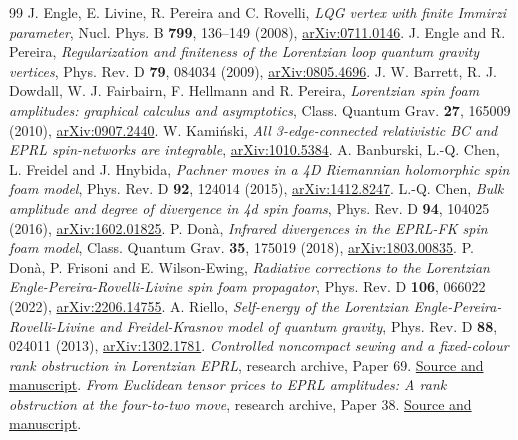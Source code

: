 \documentclass[11pt]{article}
\theoremstyle{remark}
\begin{document}
\clearpage
\begin{thebibliography}{99}
 J. Engle, E. Livine, R. Pereira and C. Rovelli, \emph{LQG vertex with finite Immirzi parameter}, Nucl. Phys. B \textbf{799}, 136--149 (2008), \href{https://arxiv.org/abs/0711.0146}{arXiv:0711.0146}.
 J. Engle and R. Pereira, \emph{Regularization and finiteness of the Lorentzian loop quantum gravity vertices}, Phys. Rev. D \textbf{79}, 084034 (2009), \href{https://arxiv.org/abs/0805.4696}{arXiv:0805.4696}.
 J. W. Barrett, R. J. Dowdall, W. J. Fairbairn, F. Hellmann and R. Pereira, \emph{Lorentzian spin foam amplitudes: graphical calculus and asymptotics}, Class. Quantum Grav. \textbf{27}, 165009 (2010), \href{https://arxiv.org/abs/0907.2440}{arXiv:0907.2440}.
 W. Kami\'nski, \emph{All 3-edge-connected relativistic BC and EPRL spin-networks are integrable}, \href{https://arxiv.org/abs/1010.5384}{arXiv:1010.5384}.
 A. Banburski, L.-Q. Chen, L. Freidel and J. Hnybida, \emph{Pachner moves in a 4D Riemannian holomorphic spin foam model}, Phys. Rev. D \textbf{92}, 124014 (2015), \href{https://arxiv.org/abs/1412.8247}{arXiv:1412.8247}.
 L.-Q. Chen, \emph{Bulk amplitude and degree of divergence in 4d spin foams}, Phys. Rev. D \textbf{94}, 104025 (2016), \href{https://arxiv.org/abs/1602.01825}{arXiv:1602.01825}.
 P. Don\`a, \emph{Infrared divergences in the EPRL-FK spin foam model}, Class. Quantum Grav. \textbf{35}, 175019 (2018), \href{https://arxiv.org/abs/1803.00835}{arXiv:1803.00835}.
 P. Don\`a, P. Frisoni and E. Wilson-Ewing, \emph{Radiative corrections to the Lorentzian Engle-Pereira-Rovelli-Livine spin foam propagator}, Phys. Rev. D \textbf{106}, 066022 (2022), \href{https://arxiv.org/abs/2206.14755}{arXiv:2206.14755}.
 A. Riello, \emph{Self-energy of the Lorentzian Engle-Pereira-Rovelli-Livine and Freidel-Krasnov model of quantum gravity}, Phys. Rev. D \textbf{88}, 024011 (2013), \href{https://arxiv.org/abs/1302.1781}{arXiv:1302.1781}.
 \emph{Controlled noncompact sewing and a fixed-colour rank obstruction in Lorentzian EPRL}, research archive, Paper 69. \href{https://github.com/g3173028019-beep/ai-automated-quantum-gravity-research/tree/main/papers/69-lorentzian-eprl-noncompact-sewing}{Source and manuscript}.
 \emph{From Euclidean tensor prices to EPRL amplitudes: A rank obstruction at the four-to-two move}, research archive, Paper 38. \href{https://github.com/g3173028019-beep/ai-automated-quantum-gravity-research/tree/main/papers/38-tensor-prices-eprl-boundary}{Source and manuscript}.
\end{thebibliography}
\end{document}
